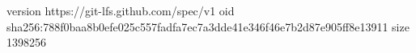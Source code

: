 version https://git-lfs.github.com/spec/v1
oid sha256:788f0baa8b0efe025c557fadfa7ec7a3dde41e346f46e7b2d87e905ff8e13911
size 1398256
